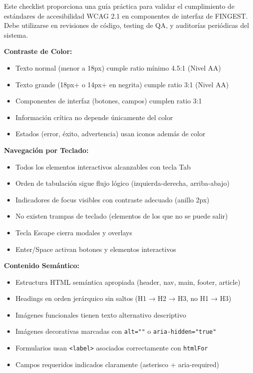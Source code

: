\documentclass[12pt,a4paper,oneside]{article}
\begin{document}
Este checklist proporciona una guía práctica para validar el cumplimiento de estándares de accesibilidad WCAG 2.1 en componentes de interfaz de FINGEST. Debe utilizarse en revisiones de código, testing de QA, y auditorías periódicas del sistema.

\textbf{Contraste de Color:}
\begin{itemize}
    \item[$\square$] Texto normal (menor a 18px) cumple ratio mínimo 4.5:1 (Nivel AA)
    \item[$\square$] Texto grande (18px+ o 14px+ en negrita) cumple ratio 3:1 (Nivel AA)
    \item[$\square$] Componentes de interfaz (botones, campos) cumplen ratio 3:1
    \item[$\square$] Información crítica no depende únicamente del color
    \item[$\square$] Estados (error, éxito, advertencia) usan iconos además de color
\end{itemize}

\textbf{Navegación por Teclado:}
\begin{itemize}
    \item[$\square$] Todos los elementos interactivos alcanzables con tecla Tab
    \item[$\square$] Orden de tabulación sigue flujo lógico (izquierda-derecha, arriba-abajo)
    \item[$\square$] Indicadores de focus visibles con contraste adecuado (anillo 2px)
    \item[$\square$] No existen trampas de teclado (elementos de los que no se puede salir)
    \item[$\square$] Tecla Escape cierra modales y overlays
    \item[$\square$] Enter/Space activan botones y elementos interactivos
\end{itemize}

\textbf{Contenido Semántico:}
\begin{itemize}
    \item[$\square$] Estructura HTML semántica apropiada (header, nav, main, footer, article)
    \item[$\square$] Headings en orden jerárquico sin saltos (H1 → H2 → H3, no H1 → H3)
    \item[$\square$] Imágenes funcionales tienen texto alternativo descriptivo
    \item[$\square$] Imágenes decorativas marcadas con \texttt{alt=""} o \texttt{aria-hidden="true"}
    \item[$\square$] Formularios usan \texttt{<label>} asociados correctamente con \texttt{htmlFor}
    \item[$\square$] Campos requeridos indicados claramente (asterisco + aria-required)
\end{itemize}
\end{document}
